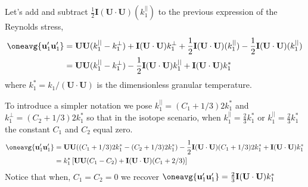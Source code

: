 Let's add and subtract $\frac{1}{2}\textbf{I}(\textbf{U}\cdot\textbf{U})(k^{||}_1)$ to the previous expression of the Reynolds stress, 
\begin{align*}
    \oneavg{\textbf{u}_1'\textbf{u}_1'}
    &= 
    \textbf{U}
    \textbf{U}
    (k^{||}_1 - k^{\bot}_1)
    + \textbf{I} 
    (\textbf{U}\cdot\textbf{U}) k^\bot_1
    + \frac{1}{2}\textbf{I} 
    (\textbf{U}\cdot\textbf{U}) (k^{||}_1)
    - \frac{1}{2}\textbf{I} 
    (\textbf{U}\cdot\textbf{U}) (k^{||}_1)\\
    &= 
    \textbf{U}
    \textbf{U}
    (k^{||}_1 - k^{\bot}_1)
    - \frac{1}{2}\textbf{I} 
    (\textbf{U}\cdot\textbf{U}) k^{||}_1
    + \textbf{I} 
    (\textbf{U}\cdot\textbf{U}) k^*_1
    \\
\end{align*}
where $ k^*_1 = k_1 /(\textbf{U}\cdot \textbf{U})$ is the dimensionless granular temperature.  

To introduce a simpler notation we pose $k^{||}_1 = (C_1 +1/3) 2k_1^*$ and $k^{\bot}_1 = (C_2+1/3) 2k_1^*$ so that in the isotope scenario,  when $k^{||}_1 = \frac{2}{3} k^*_1$ or $k^{||}_1 =\frac{2}{3} k^*_1$ the constant $C_1$ and $C_2$ equal zero. 
\begin{align*}
    \oneavg{\textbf{u}_1'\textbf{u}_1'}
    &= 
    \textbf{U}
    \textbf{U}
    ((C_1 +1/3)2k_1^* -( C_2+1/3) 2 k_1^*)
    - \frac{1}{2}\textbf{I} 
    (\textbf{U}\cdot\textbf{U})  (C_1+1/3) 2k_1^*
    + \textbf{I} 
    (\textbf{U}\cdot\textbf{U}) k^*_1\\
    &= k^*_1 \left[
        \textbf{U}
        \textbf{U}
        (C_1  - C_2 )
        + \textbf{I} 
        (\textbf{U}\cdot\textbf{U})  (C_1+2/3) 
    \right]
\end{align*}
Notice that when, $C_1=C_2= 0$ we recover $\oneavg{\textbf{u}_1'\textbf{u}_1'}=\frac{2}{3} \textbf{I}(\textbf{U}\cdot \textbf{U}) k^*_1$

